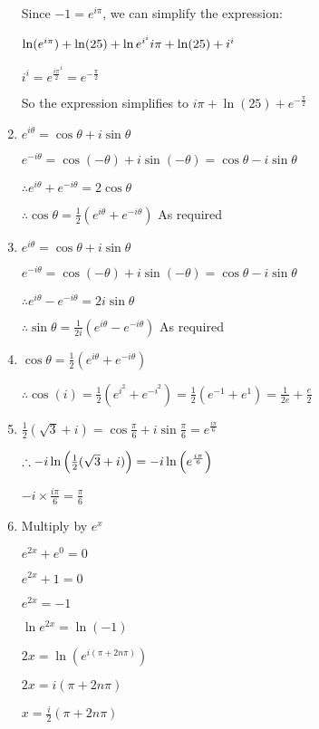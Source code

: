 \documentclass[../main.tex]{subfiles}
\begin{document}
\begin{spacing}{1.5}
\begin{enumerate}
    Since \(-1=e^{i \pi}\), we can simplify the expression:

    \(\ln(e^{i \pi})+\ln(25)+\ln{e^{i^{i}}}\\
    i \pi + \ln(25) + i^i\)

    \(i^i=e^{\frac{i \pi}{2}^{i}}=e^{-\frac{\pi}{2}}\)

    So the expression simplifies to \(i \pi + \ln(25) + e^{-\frac{\pi}{2}}\)
    
    \item 
    \(e^{i\theta}=\cos{\theta}+i\sin{\theta}\)

    \(e^{-i\theta}=\cos{(-\theta)}+i\sin{(-\theta)}=\cos{\theta}-i\sin{\theta}\)

    \(\therefore e^{i\theta}+e^{-i\theta}=2\cos{\theta}\)

    \(\therefore \cos{\theta}=\frac{1}{2}(e^{i\theta}+e^{-i\theta})\)
    As required

    \item 
    \(e^{i\theta}=\cos{\theta}+i\sin{\theta}\)

    \(e^{-i\theta}=\cos{(-\theta)}+i\sin{(-\theta)}=\cos{\theta}-i\sin{\theta}\)

    \(\therefore e^{i\theta}-e^{-i\theta}=2i\sin{\theta}\)

    \(\therefore \sin{\theta}=\frac{1}{2i}(e^{i\theta}-e^{-i\theta})\)
    As required

    \item 
    \(\cos{\theta}=\frac{1}{2}(e^{i\theta}+e^{-i\theta})\)

    \(\therefore \cos{(i)}=\frac{1}{2}(e^{i^2}+e^{-i^2})=\frac{1}{2}(e^{-1}+e^{1})=\frac{1}{2e}+\frac{e}{2}\)

    \item 
    \(\frac{1}{2}(\sqrt{3}+i)=\cos{\frac{\pi}{6}}+i\sin{\frac{\pi}{6}}=e^{\frac{i\pi}{6}}\)

    \(\therefore -i\ln{\Bigl(\frac{1}{2}(\sqrt{3}+i)\Bigr)} = -i\ln{\Bigl(e^{\frac{i\pi}{6}}\Bigr)}\)

    \(-i \times \frac{i\pi}{6}=\frac{\pi}{6}\)

    \item 
    
    Multiply by $e^x$
    
    $e^{2x}+e^{0}=0$

    $e^{2x}+1=0$

    $e^{2x}=-1$

    $\ln{e^{2x}}=\ln{(-1)}$

    $2x=\ln{(e^{i(\pi +2n\pi)})}$

    $2x=i(\pi + 2n\pi)$

    $x=\frac{i}{2}(\pi + 2n\pi)$

\end{enumerate}
\end{spacing}
\end{document}
